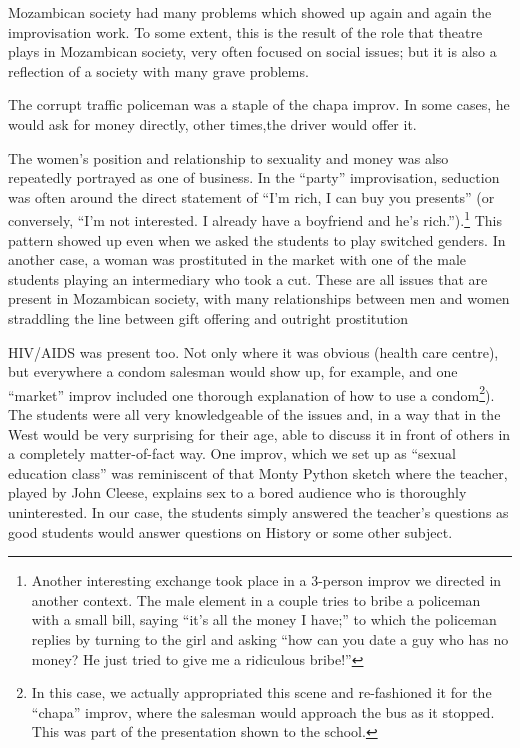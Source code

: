 \documentclass[article,twocolumn,twoside]{memoir}
\begin{document}
Mozambican society had many problems which showed up again and again the
improvisation work. To some extent, this is the result of the role that theatre
plays in Mozambican society, very often focused on social issues; but it is
also a reflection of a society with many grave problems.

The corrupt traffic policeman was a staple of the chapa improv. In some cases,
he would ask for money directly, other times,the driver would offer it.

The women's position and relationship to sexuality and money was also
repeatedly portrayed as one of business. In the ``party'' improvisation,
seduction was often around the direct statement of ``I'm rich, I can buy you
presents'' (or conversely, ``I'm not interested. I already have a boyfriend and
he's rich.'').\footnote{Another interesting exchange took place in a 3-person
improv we directed in another context. The male element in a couple tries to
bribe a policeman with a small bill, saying ``it's all the money I have;'' to
which the policeman replies by turning to the girl and asking ``how can you
date a guy who has no money? He just tried to give me a ridiculous bribe!''}
This pattern showed up even when we asked the students to play switched
genders. In another case, a woman was prostituted in the market with one of the
male students playing an intermediary who took a cut. These are all issues that
are present in Mozambican society, with many relationships between men and
women straddling the line between gift offering and outright prostitution

HIV/AIDS was present too. Not only where it was obvious (health care centre),
but everywhere a condom salesman would show up, for example, and one ``market''
improv included one thorough explanation of how to use a condom\footnote{In
this case, we actually appropriated this scene and re-fashioned it for the
``chapa'' improv, where the salesman would approach the bus as it stopped. This
was part of the presentation shown to the school.}). The students were all
very knowledgeable of the issues and, in a way that in the West would be very
surprising for their age, able to discuss it in front of others in a completely
matter-of-fact way. One improv, which we set up as ``sexual education class''
was reminiscent of that Monty Python sketch where the teacher, played by John
Cleese, explains sex to a bored audience who is thoroughly uninterested. In our
case, the students simply answered the teacher's questions as good students
would answer questions on History or some other subject.
\end{document}
